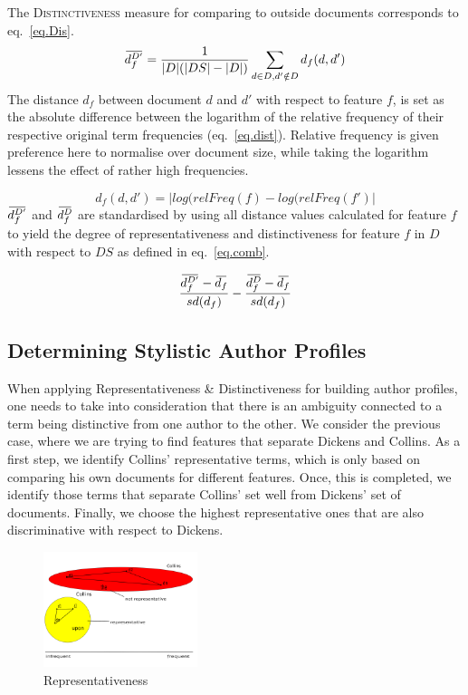 \documentclass[a4paper,10pt,twoside,fleqn]{article}
\newcommand{\overbar}[1]{\mkern 2.0mu\overline{\mkern-2.0mu#1\mkern-2.0mu}\mkern 2.0mu}
\begin{document}
The \textsc{Distinctiveness} measure for comparing to outside documents corresponds
to eq.~\ref{eq.Dis}.\\


\begin{equation}\label{eq.Dis}
 \overbar{d_f^{D'}} = \frac{1}{|D|(|DS| -|D|)} \sum\limits_{d \in D, d'\notin D} d_f(d,d')
\end{equation}
The distance $d_f$ between document $d$ and $d'$ with respect to feature $f$, is set as the
absolute difference between the logarithm of the relative frequency of their respective
original term frequencies (eq.~\ref{eq.dist}).
Relative frequency is given preference here to normalise over document size, while
taking the logarithm lessens the effect of rather high frequencies.

\begin{equation} \label{eq.dist}
 d_f(d,d') = |log(relFreq(f) - log(relFreq(f')|
\end{equation}
$\overbar{d_f^{D'}}$  and $\overbar{d_f^{D}}$ are standardised by using all
distance values calculated for feature $f$ to yield the
degree of representativeness and distinctiveness for
feature $f$ in $D$ with respect to $DS$ as defined in eq.~\ref{eq.comb}.

 \begin{equation}\label{eq.comb}
\frac{\overbar{d^{D'}_f} - \overbar{d_f} }{sd(d_f)} - \frac{\overbar{d^{D}_f} - \overbar{d_f}}{sd(d_f)}
\end{equation}


\subsection{Determining Stylistic Author Profiles}

When applying Representativeness \& Distinctiveness for building author profiles,
one needs to take into consideration that there is an ambiguity connected to
a term being  distinctive from one author to the other.
We consider the previous case, where we are trying to find features that
separate Dickens and Collins.
As a first step, we identify Collins' representative terms, which is only based on
comparing his own documents for different features. Once, this is completed,
we identify those terms that separate Collins' set well from Dickens' set
of documents.
Finally, we choose the highest representative ones that are also
discriminative with respect to Dickens.

\begin{figure}
  \caption{Representativeness}
 \begin{center}
  \includegraphics[width=0.4\textwidth]{figures/repres1-fin.png}
  \end{center}
 \end{figure}
\end{document}
